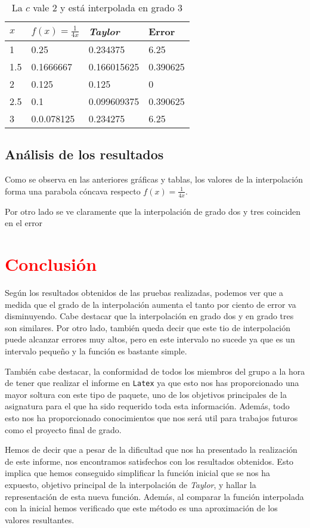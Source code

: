 \documentclass[a4paper,12pt]{article}
\begin{document}
\begin{table}[!hbt]
\begin{center}
\begin{tabular}[c]{||l | l ||l|l||}
\hline
\hline
$x$  & $f(x)=\frac{1}{4x}$ & {\em Taylor} & Error \\
\hline
1 &0.25& 0.234375 & 6.25 \\
\hline
1.5 &0.1666667&0.166015625&  0.390625\\
\hline
2 &0.125 &0.125 &  0 \\
\hline
2.5 &0.1 &0.099609375 &  0.390625 \\
\hline
3 &  0.0.078125 &  0.234275& 6.25  \\
\hline
\hline
\end{tabular}
\caption{La $c$ vale 2 y está interpolada en grado 3}
\end{center}
\end{table}
\newpage
\subsection{Análisis de los resultados}
Como se observa en las anteriores gráficas y tablas, los valores de la interpolación
forma una parabola cóncava respecto $f(x)=\frac{1}{4x}$.

Por otro lado se ve claramente que la interpolación de grado dos y tres coinciden en el error
\newpage
\section{\textcolor{red}{Conclusión}}
Según los resultados obtenidos de las pruebas realizadas, podemos ver que a medida que el grado de la interpolación aumenta el tanto por ciento de error va disminuyendo. 
Cabe destacar que la interpolación en grado dos y en grado tres son similares.
Por otro lado, también queda decir que este tio de interpolación puede alcanzar errores muy altos, pero en este intervalo no sucede ya que es un intervalo pequeño y la función es bastante simple.

También cabe destacar, la conformidad de todos los miembros del grupo a la hora de tener que realizar el informe en {\tt Latex} ya que esto nos has proporcionado una mayor soltura con este tipo 
de paquete, uno de los objetivos principales de la asignatura para el que ha sido requerido toda esta información. Además, todo esto nos ha proporcionado conocimientos 
que nos será util para trabajos futuros como el proyecto final de grado.


Hemos de decir que a pesar de la dificultad que nos ha presentado la realización de este informe, nos encontramos  satisfechos con los resultados obtenidos. 
Esto implica que hemos conseguido simplificar la función inicial que se nos ha expuesto, objetivo principal de la interpolación de {\em Taylor}, y hallar la representación de esta nueva función.
Además, al comparar  la función interpolada con la inicial hemos verificado que este método es una  aproximación de los valores resultantes.
\end{document}
